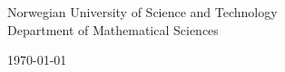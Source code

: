 \begin{titlepage}
    \begin{center}
      {\color{ntnu-blue}\sffamily\Large Norwegian University of Science and Technology}\\
      \vspace{0.3cm}
      {\sffamily\large Department of Mathematical Sciences}
  
      \vspace{0.5cm}
      {\large\today}
    \end{center}
  
    \vspace{1cm}
  \end{titlepage}
  
  
  